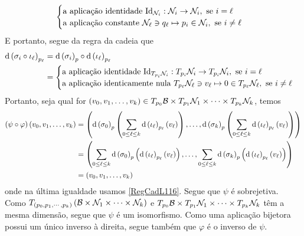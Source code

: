 \begin{demm}
\[\begin{cases}
\text{a aplicação identidade } \mathrm{Id}_{\mathcal{N}_i} : \mathcal{N}_i \to \mathcal{N}_i, \text{ se $i = \ell$ } \\
\text{a aplicação constante } \mathcal{N}_{\ell} \ni q_{\ell} \mapsto p_i \in \mathcal{N}_i, \text{ se $i \neq \ell$}
\end{cases}
\]
E portanto, segue da regra da cadeia que
\begin{equation}\label{RegCadL116}
\begin{aligned}
\mathrm{d} \left( \sigma_i \circ \iota_{\ell}   \right)_{p_{\ell}} &= \mathrm{d} \left(  \sigma_i  \right)_p \circ \mathrm{d} \left( \iota_{\ell} \right)_{p_{\ell}} \\
&=\begin{cases}
\text{a aplicação identidade } \mathrm{Id}_{T_{p_{i}}\mathcal{N}_{i}} : T_{p_{i}}\mathcal{N}_i \to T_{p_{i}}\mathcal{N}_i, \text{ se $i = \ell$ } \\
\text{a aplicação identicamente nula } T_{p_{\ell}} \mathcal{N}_{\ell} \ni v_{\ell} \mapsto 0 \in  T_{p_{\ell}} \mathcal{N}_{\ell}, \text{ se $i \neq \ell$}
\end{cases}
\end{aligned}
\end{equation}
Portanto, seja qual for $\left( v_0, v_1, \ldots, v_k \right) \in T_{p_0} \mathcal{B} \times T_{p_1} \mathcal{N}_1 \times \cdots \times T_{p_k} \mathcal{N}_k$, temos
\begin{align*}
\left( \psi \circ \varphi \right) \left( v_0, v_1, \ldots, v_k \right) &= \left(  \mathrm{d} \left( \sigma_0 \right)_p \left(   \sum_{0 \leq \ell \leq k}\mathrm{d} \left( \iota_{\ell} \right)_{p_{\ell}}\left( v_{\ell} \right) \right) , \ldots,\mathrm{d} \left( \sigma_k \right)_p \left(   \sum_{0 \leq \ell \leq k}\mathrm{d} \left( \iota_{\ell} \right)_{p_{\ell}}\left( v_{\ell} \right) \right)   \right) \\
&=\left( \sum_{0 \leq \ell \leq k} \mathrm{d} \left( \sigma_0 \right)_p \left(  \mathrm{d} \left( \iota_{\ell} \right)_{p_{\ell}}\left( v_{\ell} \right) \right), \ldots, \sum_{0 \leq \ell \leq k} \mathrm{d} \left( \sigma_k \right)_p \left(  \mathrm{d} \left( \iota_{\ell} \right)_{p_{\ell}}\left( v_{\ell} \right) \right)  \right) \\
&=\left( v_0, v_1, \ldots, v_k \right)
\end{align*}
onde na última igualdade usamos \cref{RegCadL116}. Segue que $\psi$ é sobrejetiva. Como $T_{(p_0, p_1, \cdots, p_k)} \left( \mathcal{B} \times \mathcal{N}_1 \times \cdots \times \mathcal{N}_k \right)$ e $T_{p_0} \mathcal{B} \times T_{p_1} \mathcal{N}_1 \times \cdots \times T_{p_k} \mathcal{N}_k $ têm a mesma dimensão, segue que $\psi$ é um isomorfismo. Como uma aplicação bijetora possui um único inverso à direita, segue também que $\varphi$ é o inverso de $\psi$. 
\end{demm}


